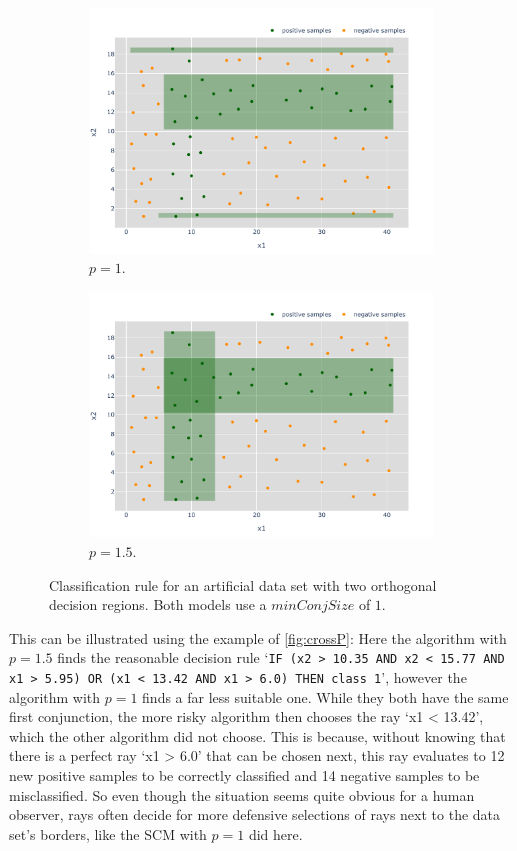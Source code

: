 \begin{figure}
    \centering
    \begin{subfigure}{\textwidth}
        \centering
        \includegraphics[width=0.85\columnwidth]{figures/cross_1.pdf}
        \caption{\(p = 1\).}
    \end{subfigure}
    \hfill
    \begin{subfigure}{\textwidth}
        \centering
        \includegraphics[width=0.85\columnwidth]{figures/cross_1_5.pdf}
        \caption{\(p = 1.5\).}
    \end{subfigure}
    \caption{Classification rule for an artificial data set with two orthogonal decision regions. Both models use a \(minConjSize\) of \(1\).}\label{fig:crossP}
\end{figure}

This can be illustrated using the example of \autoref{fig:crossP}:
Here the algorithm with \(p=1.5\) finds the reasonable decision rule `\texttt{IF (x2 > 10.35 AND x2 < 15.77 AND x1 > 5.95) OR (x1 < 13.42 AND x1 > 6.0) THEN class 1}',
however the algorithm with \(p=1\) finds a far less suitable one.
While they both have the same first conjunction, the more risky algorithm then chooses the ray `x1 < 13.42', which
the other algorithm did not choose.
This is because, without knowing that there is a perfect ray `x1 > 6.0' that can be chosen next,
this ray evaluates to 12 new positive samples to be correctly classified and 14 negative samples to be misclassified.
So even though the situation seems quite obvious for a human observer, rays often decide for
more defensive selections of rays next to the data set's borders, like the SCM with \(p=1\) did here.

